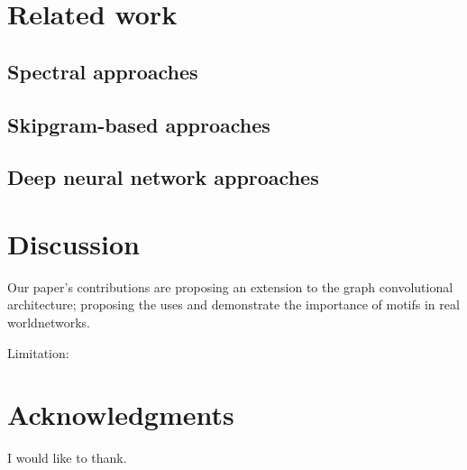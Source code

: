\documentclass{article}
\theoremstyle{definition}
\begin{document}
\section{Related work}

\subsection{Spectral approaches}

\subsection{Skipgram-based approaches }

\subsection{Deep neural network approaches}

\section{Discussion}

Our paper's contributions are proposing an extension to the graph convolutional 
architecture; proposing the uses and demonstrate the importance of motifs in
real worldnetworks.

Limitation: 


\section*{Acknowledgments}

I would like to thank.



\end{document}
